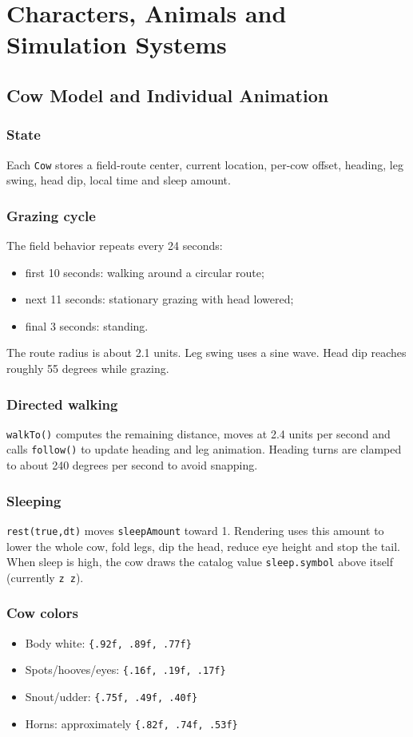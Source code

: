 \documentclass[11pt,a4paper,openany]{book}
\newcommand{\code}[1]{\texttt{#1}}
\newcommand{\rgb}[3]{\code{\{#1, #2, #3\}}}
\begin{document}
\part{Characters, Animals and Simulation Systems}

\chapter{Cow Model and Individual Animation}
\section{State}
Each \code{Cow} stores a field-route center, current location, per-cow offset, heading, leg swing, head dip, local time and sleep amount.

\section{Grazing cycle}
The field behavior repeats every 24 seconds:
\begin{itemize}
	\item first 10 seconds: walking around a circular route;
	\item next 11 seconds: stationary grazing with head lowered;
	\item final 3 seconds: standing.
\end{itemize}
The route radius is about 2.1 units. Leg swing uses a sine wave. Head dip reaches roughly 55 degrees while grazing.

\section{Directed walking}
\code{walkTo()} computes the remaining distance, moves at 2.4 units per second and calls \code{follow()} to update heading and leg animation. Heading turns are clamped to about 240 degrees per second to avoid snapping.

\section{Sleeping}
\code{rest(true,dt)} moves \code{sleepAmount} toward 1. Rendering uses this amount to lower the whole cow, fold legs, dip the head, reduce eye height and stop the tail. When sleep is high, the cow draws the catalog value \code{sleep.symbol} above itself (currently \code{z z}).

\section{Cow colors}
\begin{itemize}
	\item Body white: \rgb{.92f}{.89f}{.77f}
	\item Spots/hooves/eyes: \rgb{.16f}{.19f}{.17f}
	\item Snout/udder: \rgb{.75f}{.49f}{.40f}
	\item Horns: approximately \rgb{.82f}{.74f}{.53f}
\end{itemize}
\end{document}
